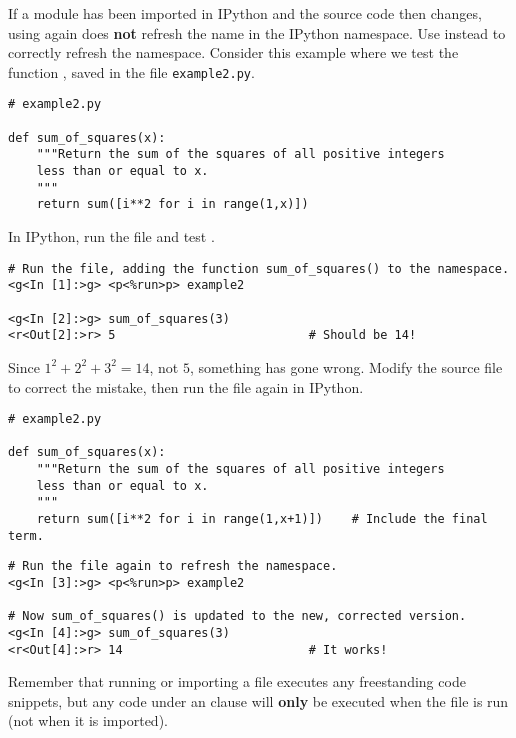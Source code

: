 \begin{warn} %
If a module has been imported in IPython and the source code then changes, using  again does \textbf{not} refresh the name in the IPython namespace.
Use  instead to correctly refresh the namespace.
Consider this example where we test the function , saved in the file \texttt{example2.py}.

\begin{lstlisting}
# example2.py

def sum_of_squares(x):
    """Return the sum of the squares of all positive integers
    less than or equal to x.
    """
    return sum([i**2 for i in range(1,x)])
\end{lstlisting}

In IPython, run the file and test .

\begin{lstlisting}
# Run the file, adding the function sum_of_squares() to the namespace.
<g<In [1]:>g> <p<%run>p> example2

<g<In [2]:>g> sum_of_squares(3)
<r<Out[2]:>r> 5                           # Should be 14!
\end{lstlisting}

Since $1^2 + 2^2 + 3^2 = 14$, not $5$, something has gone wrong.
Modify the source file to correct the mistake, then run the file again in IPython.

\begin{lstlisting}
# example2.py

def sum_of_squares(x):
    """Return the sum of the squares of all positive integers
    less than or equal to x.
    """
    return sum([i**2 for i in range(1,x+1)])    # Include the final term.
\end{lstlisting}

\begin{lstlisting}
# Run the file again to refresh the namespace.
<g<In [3]:>g> <p<%run>p> example2

# Now sum_of_squares() is updated to the new, corrected version.
<g<In [4]:>g> sum_of_squares(3)
<r<Out[4]:>r> 14                          # It works!
\end{lstlisting}

Remember that running or importing a file executes any freestanding code snippets, but any code under an  clause will \textbf{only} be executed when the file is run (not when it is imported).
\end{warn}

